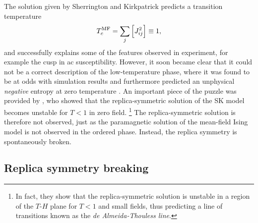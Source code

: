 The solution given by Sherrington and Kirkpatrick predicts a transition
temperature
\begin{equation}
  T_c^{\mathrm{MF}} = \sum_j \left[J_{ij}^2\right] \equiv 1,
\end{equation}
and successfully explains some of the features observed in experiment, for
example the cusp in ac susceptibility. However, it soon became clear that it
could not be a correct description of the low-temperature phase, where it was
found to be at odds with simulation results and furthermore predicted an
unphysical \emph{negative} entropy at zero temperature
\autocite{kirkpatrick1978infinite}. An important piece of the puzzle was
provided by \textcite{dealmeida1978stability}, who showed that the
replica-symmetric solution of the SK model becomes unstable for $T<1$ in zero
field.%
\footnote{%
  In fact, they show that the replica-symmetric solution is unstable in a
  region of the $T$-$H$ plane for $T<1$ and small fields, thus predicting
  a line of transitions known as the \emph{de Almeida-Thouless line}.
}
The replica-symmetric solution is therefore not observed, just as the
paramagnetic solution of the mean-field Ising model is not observed in the
ordered phase. Instead, the replica symmetry is spontaneously broken.


\subsection{Replica symmetry breaking}
\label{sec:intro-rsb}

